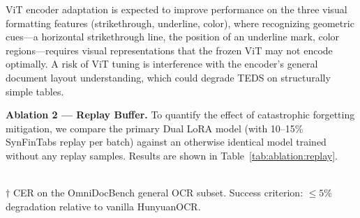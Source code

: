 \documentclass[10pt,twocolumn]{article}
\begin{document}
\begin{table}[t]
  \centering
  \caption{Ablation: LLM-only vs.\ LLM+ViT Dual LoRA.}
  \label{tab:ablation:vit}
\end{table}

ViT encoder adaptation is expected to improve performance on the three visual
formatting features (strikethrough, underline, color), where recognizing geometric
cues---a horizontal strikethrough line, the position of an underline mark, color
regions---requires visual representations that the frozen ViT may not encode
optimally. A risk of ViT tuning is interference with the encoder's general
document layout understanding, which could degrade TEDS on structurally simple
tables.

\textbf{Ablation 2 --- Replay Buffer.} To quantify the effect of catastrophic
forgetting mitigation, we compare the primary Dual LoRA model (with 10--15\%
SynFinTabs replay per batch) against an otherwise identical model trained without
any replay samples. Results are shown in Table~\ref{tab:ablation:replay}.

\begin{table}[t]
  \centering
  \caption{Ablation: replay buffer effect on general OCR.}
  \label{tab:ablation:replay}
  \smallskip\\
  \footnotesize{$\dagger$ CER on the OmniDocBench general OCR subset. Success
  criterion: $\leq 5\%$ degradation relative to vanilla HunyuanOCR.}
\end{table}
\end{document}
